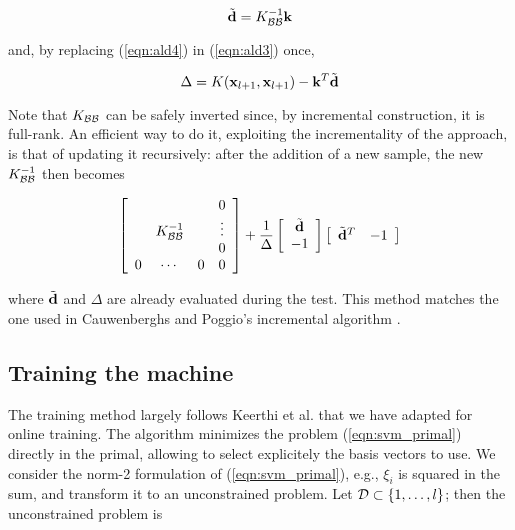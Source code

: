 \begin{equation} \label{eqn:ald4}
  \tilde{\mathbf{d}} = K_{\mathcal{B}\mathcal{B}}^{-1} \mathbf{k} \\
\end{equation}

\noindent and, by replacing (\ref{eqn:ald4}) in (\ref{eqn:ald3}) once,

\begin{equation} \label{eqn:ald5}
  \Delta = K(\mathbf{x}_{l+1},\mathbf{x}_{l+1}) - \mathbf{k}^T \tilde{\mathbf{d}}
\end{equation}

Note that $K_{\mathcal{B}\mathcal{B}}$ can be safely inverted since, by incremental
construction, it is full-rank. An efficient way to do it, exploiting
the incrementality of the approach, is that of updating it
recursively: after the addition of a new sample, the new
$K_{\mathcal{B}\mathcal{B}}^{-1}$ then becomes

\begin{equation} \label{eqn:inv_upd}
  \left[\begin{array}{cccc}
       &               &   & 0 \\
       & K_{\mathcal{B}\mathcal{B}}^{-1} &   & \vdots \\
       &               &   & 0 \\
     0 &       \cdots  & 0 & 0
  \end{array}\right]
  +
  \frac{1}{\Delta}
  \left[\begin{array}{c}
    \tilde{\mathbf{d}} \\
    -1
  \end{array}\right]
  \left[\begin{array}{cc}
    \tilde{\mathbf{d}}^T & -1
  \end{array}\right]
\end{equation}

\noindent where $\tilde{\mathbf{d}}$ and $\Delta$ are already evaluated during the
test. This method matches the one used in Cauwenberghs and Poggio's
incremental algorithm \cite{CauwenberghsP00}.

\subsection*{Training the machine}

The training method largely follows Keerthi et
al. \cite{KeerthiDC05,KeerthiCDC06} that we have adapted for online training.
The algorithm minimizes the problem (\ref{eqn:svm_primal}) directly in the primal,
allowing to select explicitely the basis vectors to use.
We consider the norm-2 formulation of (\ref{eqn:svm_primal}), e.g., $\xi_i$ is
squared in the sum, and transform it to an unconstrained problem.
Let $\mathcal{D} \subset \{1,\ldots,l\}$; then the unconstrained problem is

